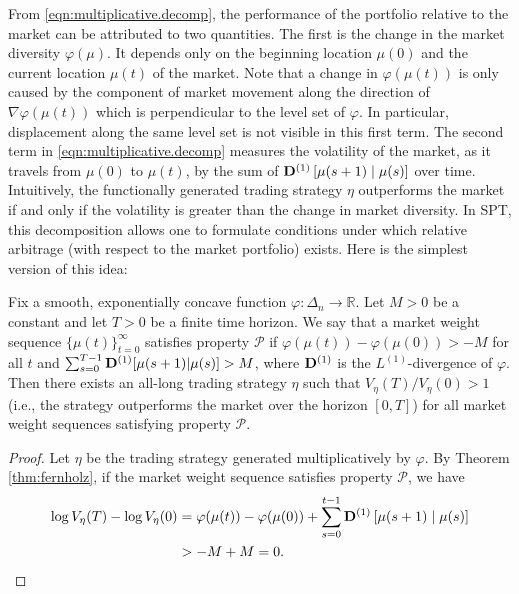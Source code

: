 \documentclass[graybox]{svmult}
\begin{document}
From \eqref{eqn:multiplicative.decomp}, the performance of the portfolio relative to the market can be attributed to two quantities. The first is the change in the market diversity $\varphi(\mu)$. It depends only on the beginning location $\mu(0)$ and the current location $\mu(t)$ of the market. Note that a change in $\varphi(\mu(t))$ is only caused by the component of market movement along the direction of $\nabla \varphi(\mu(t))$ which is perpendicular to the level set of $\varphi$. In particular, displacement along the same level set is not visible in this first term. The second term in \eqref{eqn:multiplicative.decomp} measures the volatility of the market, as it travels from $\mu(0)$ to $\mu(t)$, by the sum of ${\bf D}^{(1)}\left[ \mu(s + 1) \mid \mu(s) \right]$ over time. Intuitively, the functionally generated trading strategy $\eta$ outperforms the market if and only if the volatility is greater than the change in market diversity. In SPT, this decomposition allows one to formulate conditions under which relative arbitrage (with respect to the market portfolio) exists. Here is the simplest version of this idea:

\begin{proposition}  \label{prop:relative.arbitrage}
Fix a smooth, exponentially concave function $\varphi: \Delta_n \rightarrow \mathbb{R}$. Let $M > 0$ be a constant and let $T > 0$ be a finite time horizon.  We say that a market weight sequence $\{\mu(t)\}_{t = 0}^{\infty}$ satisfies property $\mathcal{P}$ if $\varphi(\mu(t)) - \varphi(\mu(0)) > -M$ for all $t$ and $\sum_{s =0}^{T - 1} {\bf D}^{(1)} [ \mu(s + 1) | \mu(s) ] > M$, where ${\bf D}^{(1)}$ is the $L^{(1)}$-divergence of $\varphi$.  Then there exists an all-long trading strategy $\eta$ such that $V_{\eta}(T)/V_{\eta}(0) > 1$ (i.e., the strategy outperforms the market over the horizon $[0, T]$) for all market weight sequences satisfying property $\mathcal{P}$.
\end{proposition}
\begin{proof}
Let $\eta$ be the trading strategy generated multiplicatively by $\varphi$. By Theorem \ref{thm:fernholz}, if the market weight sequence satisfies property $\mathcal{P}$, we have
\begin{equation*}
\begin{split}
\log V_{\eta}(T) - \log V_{\eta}(0) &= \varphi(\mu(t)) - \varphi(\mu(0)) + \sum_{s = 0}^{t - 1} {\bf D}^{(1)} \left[ \mu(s + 1) \mid \mu(s)\right] \\
  &> -M + M = 0.
\end{split}
\end{equation*}
\end{proof}
\end{document}
